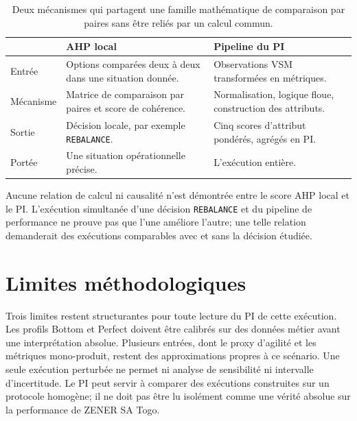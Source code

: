 \begin{table}[H]
  \centering
  \begin{tabularx}{\textwidth}{L{0.20\textwidth} Y Y}
    \toprule
    & AHP local & Pipeline du PI \\
    \midrule
    Entrée & Options comparées deux à deux dans une situation donnée. & Observations VSM transformées en métriques. \\
    Mécanisme & Matrice de comparaison par paires et score de cohérence. & Normalisation, logique floue, construction des attributs. \\
    Sortie & Décision locale, par exemple \texttt{REBALANCE}. & Cinq scores d'attribut pondérés, agrégés en PI. \\
    Portée & Une situation opérationnelle précise. & L'exécution entière. \\
    \bottomrule
  \end{tabularx}
  \caption{Deux mécanismes qui partagent une famille mathématique de comparaison par paires sans être reliés par un calcul commun.}
  \label{tab:ahp-vs-pi}
\end{table}

Aucune relation de calcul ni causalité n'est démontrée entre le score AHP local et le PI. L'exécution simultanée d'une décision \texttt{REBALANCE} et du pipeline de performance ne prouve pas que l'une améliore l'autre; une telle relation demanderait des exécutions comparables avec et sans la décision étudiée.

\section{Limites méthodologiques}

Trois limites restent structurantes pour toute lecture du PI de cette exécution. Les profils Bottom et Perfect doivent être calibrés sur des données métier avant une interprétation absolue. Plusieurs entrées, dont le proxy d'agilité et les métriques mono-produit, restent des approximations propres à ce scénario. Une seule exécution perturbée ne permet ni analyse de sensibilité ni intervalle d'incertitude. Le PI peut servir à comparer des exécutions construites sur un protocole homogène; il ne doit pas être lu isolément comme une vérité absolue sur la performance de ZENER SA Togo.
